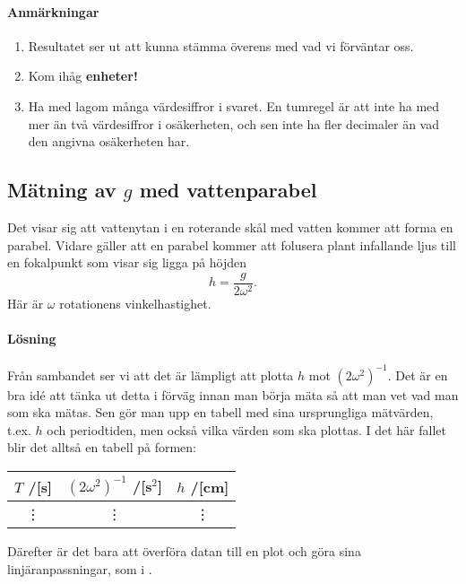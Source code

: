 \documentclass[11pt,a4paper, swedish
]{article}
\begin{document}
\paragraph{Anmärkningar}
\begin{enumerate}
\item Resultatet ser ut att kunna stämma överens med vad vi förväntar
  oss. 
\item  Kom ihåg \textbf{enheter!}
\item Ha med lagom många värdesiffror i svaret. En tumregel är att
  inte ha med mer än två\footnotemark{} värdesiffror i osäkerheten,
  och sen inte ha fler decimaler än vad den angivna osäkerheten har. 
\end{enumerate}


\subsection{Mätning av $g$ med vattenparabel}\label{sec:vattenparabel}
Det visar sig att vattenytan i en roterande skål med vatten kommer att
forma en parabel\footnotemark{}. Vidare gäller att en parabel kommer
att folusera plant infallande ljus till en fokalpunkt som visar sig
ligga på höjden
\begin{equation}\label{eq:vattenparabel}
h=\frac{g}{2\omega^2}.
\end{equation}
Här är $\omega$ rotationens vinkelhastighet.

\paragraph{Lösning}
Från sambandet ser vi att det är lämpligt att plotta $h$ mot
$(2\omega^2)^{-1}$. Det är en bra idé att tänka ut detta i förväg
innan man börja mäta så att man vet vad man som ska mätas. Sen gör man
upp en tabell med sina ursprungliga mätvärden, t.ex. $h$ och
periodtiden, men också vilka värden som ska plottas. I det här fallet
blir det alltså en tabell på formen:
\vspace{-2mm}
\begin{center}
\begin{tabular}{|c|c|c|}\hline
  $T$ /[s] & $(2\omega^2)^{-1}$ /[s$^2$] & $h$ /[cm]
\\\hline
  \vdots&  \vdots&  \vdots 
\\\hline
\end{tabular}
\end{center}
Därefter är det bara att överföra datan till en plot och göra sina
linjäranpassningar, som i . 
\end{document}
